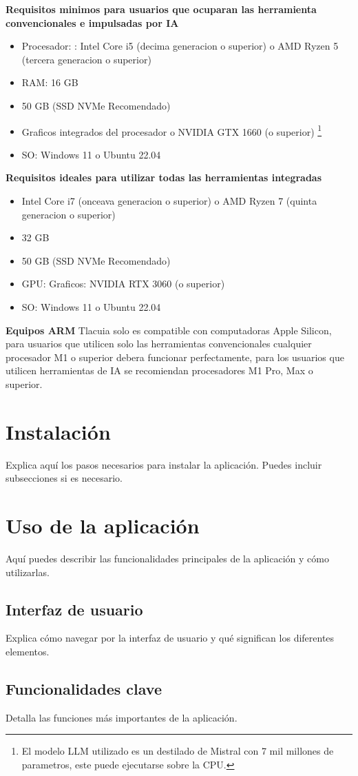 \documentclass[12pt, letterpaper]{article}
\begin{document}
\textbf{Requisitos minimos para usuarios que ocuparan las herramienta convencionales e impulsadas por IA}
\begin{itemize}
    \item Procesador: : Intel Core i5 (decima generacion o superior) o AMD Ryzen 5 (tercera generacion o superior)
    \item RAM: 16 GB
    \item 50 GB (SSD NVMe Recomendado)
    \item Graficos integrados del procesador o NVIDIA GTX 1660 (o superior) \footnote{
        El modelo LLM utilizado es un destilado de Mistral con 7 mil millones de parametros, este puede ejecutarse sobre la CPU. 
    }
    \item SO: Windows 11 o Ubuntu 22.04
\end{itemize}

\textbf{Requisitos ideales para utilizar todas las herramientas integradas}
\begin{itemize}
    \item Intel Core i7 (onceava generacion o superior) o AMD Ryzen 7 (quinta generacion o superior)
    \item 32 GB
    \item 50 GB (SSD NVMe Recomendado)
    \item GPU: Graficos: NVIDIA RTX 3060 (o superior)
    \item SO: Windows 11 o Ubuntu 22.04
\end{itemize}

\textbf{Equipos ARM}
Tlacuia solo es compatible con computadoras Apple Silicon, para usuarios que utilicen solo las herramientas convencionales cualquier procesador 
M1 o superior debera funcionar perfectamente, para los usuarios que utilicen herramientas de IA se recomiendan procesadores M1 Pro, Max o superior. 

\section{Instalación}
Explica aquí los pasos necesarios para instalar la aplicación. Puedes incluir subsecciones si es necesario.

\section{Uso de la aplicación}
Aquí puedes describir las funcionalidades principales de la aplicación y cómo utilizarlas.

\subsection{Interfaz de usuario}
Explica cómo navegar por la interfaz de usuario y qué significan los diferentes elementos.

\subsection{Funcionalidades clave}
Detalla las funciones más importantes de la aplicación.
\end{document}

